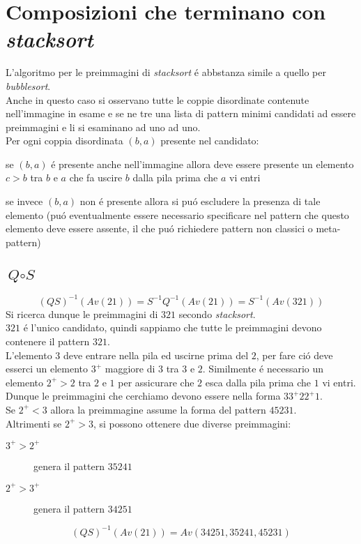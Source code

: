 \section*{Composizioni che terminano con \textit{stacksort}}
L'algoritmo per le preimmagini di \textit{stacksort} \'e abbstanza simile a quello per \textit{bubblesort}.\\
Anche in questo caso si osservano tutte le coppie disordinate contenute nell'immagine in esame e se ne tre una lista di pattern minimi candidati ad essere preimmagini e li si esaminano ad uno ad uno.\\
Per ogni coppia disordinata $(b,a)$ presente nel candidato: 
\begin{description}
\item se $(b,a)$ \'e presente anche nell'immagine allora deve essere presente un elemento $c>b$ tra $b$ e $a$ che fa uscire $b$ dalla pila prima che $a$ vi entri
\item se invece $(b,a)$ non \'e presente allora si pu\'o escludere la presenza di tale elemento (pu\'o eventualmente essere necessario specificare nel pattern che questo elemento deve essere assente, il che pu\'o richiedere pattern non classici o meta-pattern\cite{claesson2012sorting})
\end{description}
\subsection*{$\textit{Q}\circ\textit{S}$}$$(QS)^{-1}(Av(21))=S^{-1}Q^{-1}(Av(21))=S^{-1}(Av(321))$$
Si ricerca dunque le preimmagini di $321$ secondo \textit{stacksort}.\\$321$ \'e l'unico candidato, quindi sappiamo che tutte le preimmagini devono contenere il pattern $321$.\\
L'elemento $3$ deve entrare nella pila ed uscirne prima del $2$, per fare ci\'o deve esserci un elemento $3^+$ maggiore di $3$ tra $3$ e $2$. Similmente \'e necessario un elemento $2^+>2$ tra $2$ e $1$ per assicurare che $2$ esca dalla pila prima che $1$ vi entri.\\
Dunque le preimmagini che cerchiamo devono essere nella forma $33^+22^+1$.\\
Se $2^+<3$ allora la preimmagine assume la forma del pattern $45231$.\\
Altrimenti se $2^+>3$, si possono ottenere due diverse preimmagini:
\begin{description}
	\item[$3^+>2^+$] genera il pattern $35241$
	\item[$2^+>3^+$] genera il pattern $34251$
\end{description}
$$(QS)^{-1}(Av(21)) = Av(34251, 35241, 45231)$$
